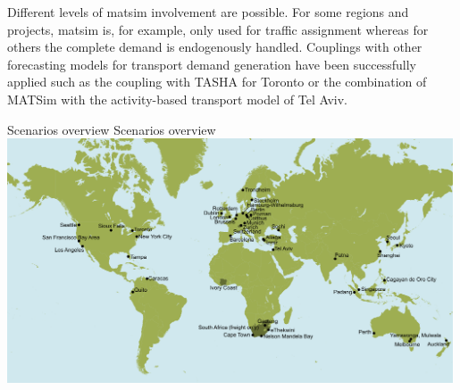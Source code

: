 Different levels of \gls{matsim} involvement are possible. For some regions and projects, \gls{matsim} is, for example, only used for traffic assignment whereas for others the complete demand is endogenously handled. Couplings with other forecasting models for transport demand generation have been successfully applied such as the coupling with TASHA for Toronto or the combination of MATSim with the activity-based transport model of Tel Aviv.

\createfigure%
{Scenarios overview}%
{Scenarios overview}%
{\label{fig:scenarios}}%
{\includegraphics[width=0.99\textwidth, angle=0]{using/figures/MATSimModelsMap}}%
{}

\clearpage
 \cleardoublepage

 \cleardoublepage

 \cleardoublepage

 \cleardoublepage

 \cleardoublepage

 \cleardoublepage

